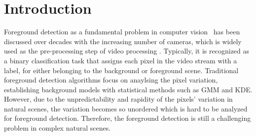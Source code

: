 \documentclass[journal]{IEEEtran}
\begin{document}
\IEEEpeerreviewmaketitle

\section{Introduction}
Foreground detection as a fundamental problem in computer vision\ \cite{Bouwmans201431} has been discussed over decades with the increasing number of cameras,
which is widely used as the pre-processing step of video processing \cite{Barnich2011_2011_TIP}.
Typically, it is recognized as a binary classification task that assigns each pixel in the video stream with a label, 
for either belonging to the background or foreground scene.
Traditional foreground detection algorithms focus on anaylsing the pixel variation, establishing background models with statistical methods such as GMM\cite{Stauffer1999} and KDE\cite{Elgammal2000Non}.
However, due to the unpredictability and rapidity of the pixels' variation in natural scenes,
the variation becomes so unordered which is hard to be analyzed for foreground detection.
Therefore, the foreground detection is still a challenging problem in complex natural scenes.
%
%

\end{document}
